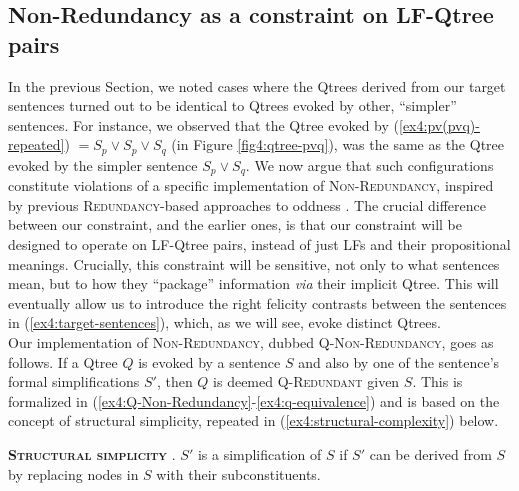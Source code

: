    

\subsection{Non-Redundancy as a constraint on LF-Qtree pairs}

In the previous Section, we noted cases where the Qtrees derived from our target sentences turned out to be identical to Qtrees evoked by other, ``simpler'' sentences.
For instance, we observed that the Qtree evoked by (\ref{ex4:pv(pvq)-repeated}) $= S_p \vee S_p \vee S_q$ (in Figure \ref{fig4:qtree-pvq}), was the same as the Qtree evoked by the simpler sentence $S_p \vee S_q$. We now argue that such configurations constitute violations of a specific implementation of \textsc{Non-Redundancy}, inspired by previous \textsc{Redundancy}-based approaches to oddness \parencite{Meyer2013,Katzir2014,Mayr2016}. The crucial difference between our constraint, and the earlier ones, is that our constraint will be designed to operate on LF-Qtree pairs, instead of just LFs and their propositional meanings. Crucially, this constraint will be sensitive, not only to what sentences mean, but to how they ``package'' information \textit{via} their implicit Qtree. This will eventually allow us to introduce the right felicity contrasts between the sentences in (\ref{ex4:target-sentences}), which, as we will see, evoke distinct Qtrees.\\

Our implementation of \textsc{Non-Redundancy}, dubbed \textsc{Q-Non-Redundancy}, goes as follows. If a Qtree $Q$ is evoked by a sentence $S$ and also by one of the sentence's formal simplifications $S'$, then $Q$ is deemed \textsc{Q-Redundant} given $S$. This is formalized in (\ref{ex4:Q-Non-Redundancy}-\ref{ex4:q-equivalence}) and is based on the concept of structural simplicity, repeated in (\ref{ex4:structural-complexity}) below.


\begin{exe}
	\ex 
		\label{ex4:Q-Non-Redundancy}
		\label{ex4:q-equivalence}
	 {\textsc{\textbf{Structural simplicity}} \parencite{Katzir2007}. $S'$ is a simplification of $S$ if $S'$ can be derived from $S$ by replacing nodes in $S$ with their subconstituents.}
\end{exe}





